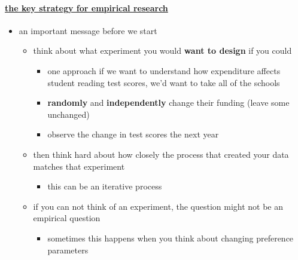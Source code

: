 \paragraph{\underline{the key strategy for empirical research}}
\begin{itemize}
\item an important message before we start
\begin{itemize}
\item think about what experiment you would \textbf{want to design} if you
          could
\begin{itemize}
\item one approach if we want to understand how expenditure affects student
            reading test scores, we'd want to take all of the schools
\item \textbf{randomly} and \textbf{independently} change their funding (leave
            some unchanged)
\item observe the change in test scores the next year
\end{itemize}
\item then think hard about how closely the process that created
          your data matches that experiment
\begin{itemize}
\item this can be an iterative process
\end{itemize}
\item if you can not think of an experiment, the question might not
          be an empirical question
\begin{itemize}
\item sometimes this happens when you think about changing
            preference parameters
\end{itemize}
\end{itemize}
\end{itemize}

